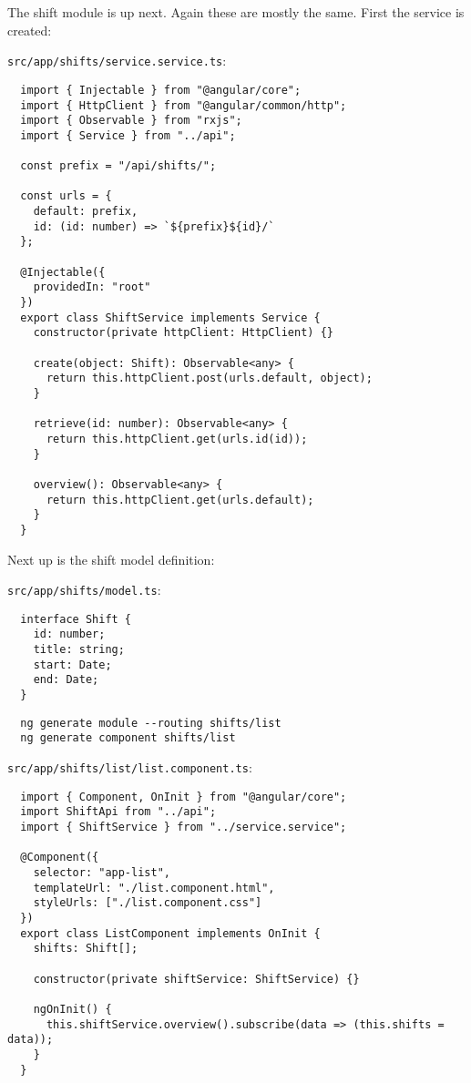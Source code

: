 The shift module is up next. Again these are mostly the same. First the service is created:

\texttt{src/app/shifts/service.service.ts}:
\begin{verbatim}
  import { Injectable } from "@angular/core";
  import { HttpClient } from "@angular/common/http";
  import { Observable } from "rxjs";
  import { Service } from "../api";

  const prefix = "/api/shifts/";

  const urls = {
    default: prefix,
    id: (id: number) => `${prefix}${id}/`
  };

  @Injectable({
    providedIn: "root"
  })
  export class ShiftService implements Service {
    constructor(private httpClient: HttpClient) {}

    create(object: Shift): Observable<any> {
      return this.httpClient.post(urls.default, object);
    }

    retrieve(id: number): Observable<any> {
      return this.httpClient.get(urls.id(id));
    }

    overview(): Observable<any> {
      return this.httpClient.get(urls.default);
    }
  }
\end{verbatim}

Next up is the shift model definition:

\texttt{src/app/shifts/model.ts}:
\begin{verbatim}
  interface Shift {
    id: number;
    title: string;
    start: Date;
    end: Date;
  }
\end{verbatim}

\begin{verbatim}
  ng generate module --routing shifts/list
  ng generate component shifts/list
\end{verbatim}

\texttt{src/app/shifts/list/list.component.ts}:
\begin{verbatim}
  import { Component, OnInit } from "@angular/core";
  import ShiftApi from "../api";
  import { ShiftService } from "../service.service";

  @Component({
    selector: "app-list",
    templateUrl: "./list.component.html",
    styleUrls: ["./list.component.css"]
  })
  export class ListComponent implements OnInit {
    shifts: Shift[];

    constructor(private shiftService: ShiftService) {}

    ngOnInit() {
      this.shiftService.overview().subscribe(data => (this.shifts = data));
    }
  }
\end{verbatim}

